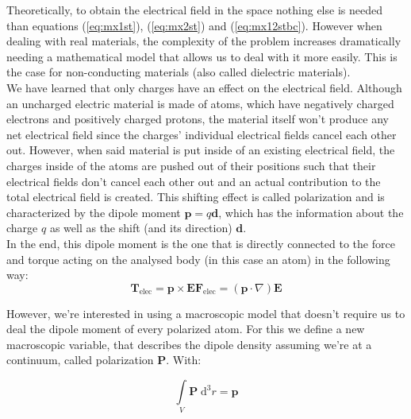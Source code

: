 Theoretically, to obtain the electrical field in the space nothing else is needed than equations (\ref{eq:mx1st}), (\ref{eq:mx2st}) and (\ref{eq:mx12stbc}). However when dealing with real materials, the complexity of the problem increases dramatically needing a mathematical model that allows us to deal with it more easily. This is the case for non-conducting materials (also called dielectric materials).\\

We have learned that only charges have an effect on the electrical field. Although an uncharged electric material is made of atoms, which have negatively charged electrons and positively charged protons, the material itself won't produce any net electrical field since the charges' individual electrical fields cancel each other out. However, when said material is put inside of an existing electrical field, the charges inside of the atoms are pushed out of their positions such that their electrical fields don't cancel each other out and an actual contribution to the total electrical field is created. This shifting effect is called polarization and is characterized by the dipole moment $\textbf{p} = q\textbf{d}$, which has the information about the charge $q$ as well as the shift (and its direction) $\textbf{d}$.\\

In the end, this dipole moment is the one that is directly connected to the force and torque acting on the analysed body (in this case an atom) in the following way:
\begin{subequations}
\begin{equation}\label{eq:elecdiptorque}
\textbf{T}_\text{elec} = \textbf{p}\times\textbf{E}
\end{equation}
\begin{equation}\label{eq:elecdiptorque}
\textbf{F}_\text{elec} = (\textbf{p}\cdot\nabla)\textbf{E}
\end{equation}
\end{subequations}

However, we're interested in using a macroscopic model that doesn't require us to deal the dipole moment of every polarized atom. For this we define a new macroscopic variable, that describes the dipole density assuming we're at a continuum, called polarization $\textbf{P}$. With:

\begin{equation}
\int\limits_V \textbf{P} \;\mathrm{d}^3r = \textbf{p}
\end{equation}

